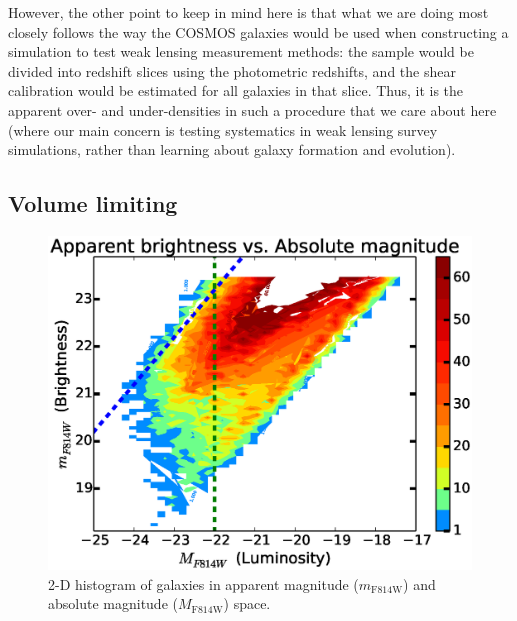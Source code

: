 \documentclass[twocolumn,useAMS,usenatbib]{mn2e}
\begin{document}
However, the other point to keep in mind here is that what we are
doing most closely follows the way the COSMOS galaxies would be used
when constructing a simulation to test weak lensing measurement
methods: the sample would be divided into redshift slices using the
photometric redshifts, and the shear calibration would be estimated
for all galaxies in that slice.  Thus, it is the apparent over- and
under-densities in such a procedure that we care about here (where our
main concern is testing systematics in weak lensing survey
simulations, rather than learning about galaxy formation and
evolution).

\subsection{Volume limiting}
\label{sub:volumelimiting}
\begin{figure}
  \centering
   \includegraphics[width=\columnwidth]{hist2d_mag_mi}
   \caption{2-D histogram of galaxies in apparent magnitude ($m_\text{F814W}$) and absolute magnitude ($M_\text{F814W}$) space.}
   \label{fig:2Dhist}
\end{figure}
\end{document}
